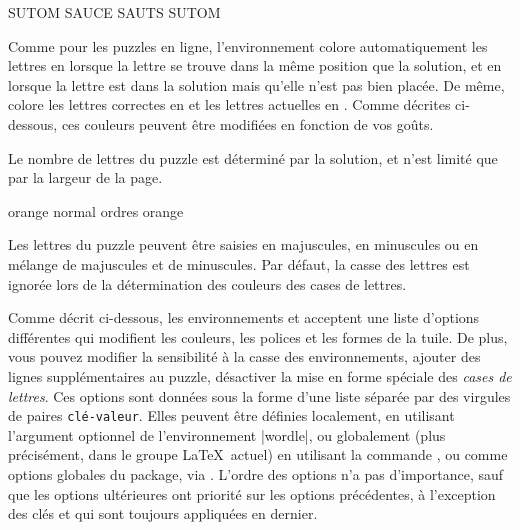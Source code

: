 \documentclass[svgnames]{report}
\begin{document}
  \begin{example}
  \begin{wordle}{SUTOM}
    SAUCE
    SAUTS
    SUTOM
  \end{wordle}
  \end{example}

  Comme pour les puzzles en ligne, l'environnement 
  colore automatiquement les lettres en
  lorsque la lettre se trouve dans la même position que la solution, et en
   lorsque la lettre est dans la solution mais qu'elle n'est pas bien placée.
  De même,  colore les lettres correctes en
  et les lettres actuelles en
  .
  Comme décrites ci-dessous, ces couleurs peuvent être modifiées en fonction de vos goûts.

  Le nombre de lettres du puzzle est déterminé par la solution, et n'est limité que par la largeur de la page.

  \begin{example}
  \begin{wordle}[Lignes=4]{orange}
     normal
     ordres
     orange
  \end{wordle}
  \end{example}

  Les lettres du puzzle peuvent être saisies en majuscules, en minuscules ou en mélange de majuscules et de minuscules. Par défaut, la casse des lettres est ignorée lors de la détermination des couleurs des cases de lettres.

  Comme décrit ci-dessous, les environnements  et  acceptent une liste d'options différentes qui modifient les couleurs, les polices et les formes de la tuile. De plus, vous pouvez modifier la sensibilité à la casse des environnements, ajouter des lignes supplémentaires au puzzle, désactiver la mise en forme spéciale des \textit{cases de lettres}. Ces options sont données sous la forme d'une liste séparée par des virgules de paires \texttt{clé-valeur}. Elles peuvent être définies localement, en utilisant l'argument optionnel de l'environnement \keyword|wordle|, ou globalement (plus précisément, dans le groupe \LaTeX\ actuel) en utilisant la commande \keyword{\ParamsSutom} , ou comme options globales du package, via \keyword{\usepackage[options]{wordle}}. L'ordre des options n'a pas d'importance, sauf que les options ultérieures ont priorité sur les options précédentes, à l'exception des clés  et  qui sont toujours appliquées en dernier.
\end{document}
